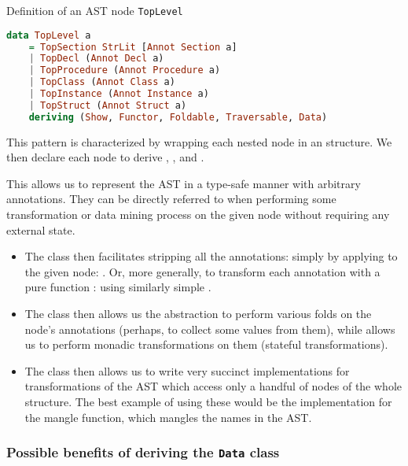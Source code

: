 \begin{listing}
    \caption{Definition of an AST node \texttt{TopLevel}}
    \label{lst:topLevel}
    \begin{lstlisting}[language=Haskell]
data TopLevel a
    = TopSection StrLit [Annot Section a]
    | TopDecl (Annot Decl a)
    | TopProcedure (Annot Procedure a)
    | TopClass (Annot Class a)
    | TopInstance (Annot Instance a)
    | TopStruct (Annot Struct a)
    deriving (Show, Functor, Foldable, Traversable, Data)
    \end{lstlisting}
\end{listing}

This pattern is characterized by wrapping each nested node  in an  structure. We then declare each node to derive , ,  and .

This allows us to represent the AST in a type-safe manner with arbitrary annotations. They can be directly referred to when performing some transformation or data mining process on the given node without requiring any external state.

\begin{itemize}
    \item The  class then facilitates stripping all the annotations: simply by applying  to the given node: . Or, more generally, to transform each annotation with a pure function : using similarly simple .

    \item The  class then allows us the abstraction to perform various folds on the node's annotations (perhaps, to collect some values from them), while  allows us to perform monadic transformations on them (stateful transformations).

    \item The  class then allows us to write very succinct implementations for transformations of the AST which access only a handful of nodes of the whole structure. The best example of using these would be the implementation for the mangle function, which mangles the names in the AST.
\end{itemize}

\subsubsection{Possible benefits of deriving the \texttt{Data} class}

